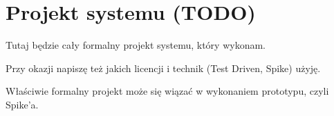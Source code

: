 \chapter{Projekt systemu (TODO)}
Tutaj będzie cały formalny projekt systemu, który wykonam.

Przy okazji napiszę też jakich licencji i technik (Test Driven, Spike) użyję.

Właściwie formalny projekt może się wiązać w wykonaniem prototypu, czyli Spike'a. 

%
%
%


